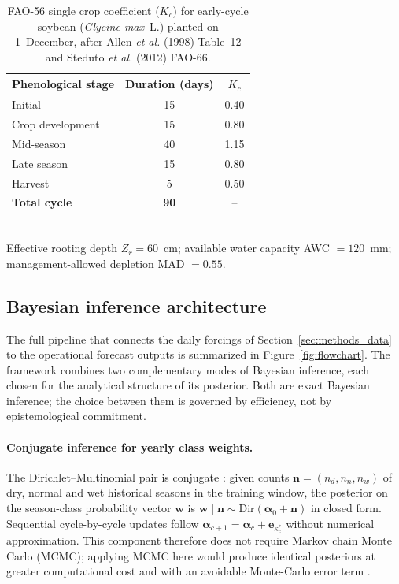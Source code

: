 \documentclass[review,5p,times]{elsarticle}
\begin{document}
\begin{table}[!t]
\centering
\caption{FAO-56 single crop coefficient ($K_c$) for early-cycle soybean
(\textit{Glycine max}~L.) planted on 1~December, after Allen
\textit{et al.} (1998) Table~12 and Steduto \textit{et al.} (2012)
FAO-66.}
\label{tab:kc}
\begin{tabular}{lcc}
\toprule
\textbf{Phenological stage} & \textbf{Duration (days)} & \textbf{$K_c$} \\
\midrule
Initial          & 15 & 0.40 \\
Crop development & 15 & 0.80 \\
Mid-season       & 40 & 1.15 \\
Late season      & 15 & 0.80 \\
Harvest          &  5 & 0.50 \\
\midrule
\textbf{Total cycle} & \textbf{90} & -- \\
\bottomrule
\end{tabular}
\\[0.4em]
\footnotesize{Effective rooting depth $Z_r = 60$~cm; available water
capacity AWC $= 120$~mm; management-allowed depletion MAD $= 0.55$.}
\end{table}

\subsection{Bayesian inference architecture}\label{sec:methods_inference}

The full pipeline that connects the daily forcings of
Section~\ref{sec:methods_data} to the operational forecast outputs is
summarized in Figure~\ref{fig:flowchart}. The framework combines two complementary modes of Bayesian inference,
each chosen for the analytical structure of its posterior. Both are
exact Bayesian inference; the choice between them is governed by
efficiency, not by epistemological commitment.

\paragraph{Conjugate inference for yearly class weights.}
The Dirichlet--Multinomial pair is conjugate
\cite{Gelman2013}: given counts $\mathbf{n}=(n_d,n_n,n_w)$ of dry,
normal and wet historical seasons in the training window, the
posterior on the season-class probability vector $\mathbf{w}$ is
$\mathbf{w}\mid\mathbf{n} \sim \mathrm{Dir}(\boldsymbol{\alpha}_0+\mathbf{n})$
in closed form. Sequential cycle-by-cycle updates follow
$\boldsymbol{\alpha}_{c+1}=\boldsymbol{\alpha}_c+\mathbf{e}_{\kappa^*_c}$
without numerical approximation. This component therefore does not
require Markov chain Monte Carlo (MCMC); applying MCMC here would
produce identical posteriors at greater computational cost and with
an avoidable Monte-Carlo error term \cite[Ch.\,3]{Gelman2013}.
\end{document}
